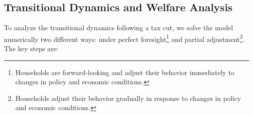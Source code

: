 





\subsection{Transitional Dynamics and Welfare Analysis}
To analyze the transitional dynamics following a tax cut, we solve the model numerically two different ways: under perfect foresight\footnote{Households are forward-looking and adjust their behavior immediately to changes in policy and economic conditions.} and partial adjustment\footnote{Households adjust their behavior gradually in response to changes in policy and economic conditions.}. The key steps are:


